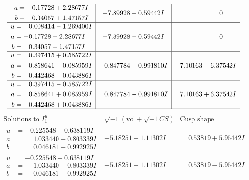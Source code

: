 \documentclass[1p]{elsarticle_modified}
\theoremstyle{definition}
\newcommand{\I}{\sqrt{-1}}
\begin{document}
$$\begin{array}{c|c|c}
\begin{aligned}
a &= -0.17728 + 2.28677 I \\
b &= \phantom{-}0.34057 + 1.47157 I\end{aligned}
 & -7.89928 + 0.59442 I & \phantom{-0.000000 } 0 \\ \hline\begin{aligned}
u &= \phantom{-}0.008414 - 1.269400 I \\
a &= -0.17728 - 2.28677 I \\
b &= \phantom{-}0.34057 - 1.47157 I\end{aligned}
 & -7.89928 - 0.59442 I & \phantom{-0.000000 } 0 \\ \hline\begin{aligned}
u &= \phantom{-}0.397415 + 0.585722 I \\
a &= \phantom{-}0.858641 - 0.085959 I \\
b &= \phantom{-}0.442468 - 0.043886 I\end{aligned}
 & \phantom{-}0.847784 + 0.991810 I & \phantom{-}7.10163 - 6.37542 I \\ \hline\begin{aligned}
u &= \phantom{-}0.397415 - 0.585722 I \\
a &= \phantom{-}0.858641 + 0.085959 I \\
b &= \phantom{-}0.442468 + 0.043886 I\end{aligned}
 & \phantom{-}0.847784 - 0.991810 I & \phantom{-}7.10163 + 6.37542 I\\
 \hline 
 \end{array}$$\newpage$$\begin{array}{c|c|c}  
\text{Solutions to }I^u_{1}& \I (\text{vol} + \sqrt{-1}CS) & \text{Cusp shape}\\
 \hline 
\begin{aligned}
u &= -0.225548 + 0.638119 I \\
a &= \phantom{-}1.033440 + 0.803339 I \\
b &= \phantom{-}0.046181 - 0.992925 I\end{aligned}
 & -5.18251 - 1.11302 I & \phantom{-}0.53819 + 5.95442 I \\ \hline\begin{aligned}
u &= -0.225548 - 0.638119 I \\
a &= \phantom{-}1.033440 - 0.803339 I \\
b &= \phantom{-}0.046181 + 0.992925 I\end{aligned}
 & -5.18251 + 1.11302 I & \phantom{-}0.53819 - 5.95442 I \\ \hline\begin{aligned}

\end{aligned}
\end{array}$$
\end{document}
